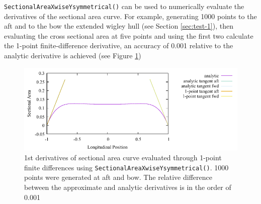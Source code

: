 \documentclass{report}
\begin{document}
\newpar \texttt{SectionalAreaXwiseYsymmetrical()} can be used to numerically evaluate the derivatives of the sectional area curve.
For example, generating 1000 points to the aft and to the bow the extended wigley hull (see Section \ref{sec:test-1}), then evaluating 
the cross sectional area at five points and using the first two calculate the 1-point finite-difference derivative, an accuracy of 
0.001 relative to the analytic derivative is achieved (see Figure \ref{fig:test-2-1K-l-100-derivatives})
\begin{figure}[H]
    \centering
    \includegraphics[width=0.7\linewidth]{figures/test-2-1K-l-100-derivatives.pdf}
    \caption{1st derivatives of sectional area curve evaluated through 1-point finite differences using \texttt{SectionalAreaXwiseYsymmetrical()}. 
    1000 points were generated at aft and bow. The relative difference between the approximate
    and analytic derivatives is in the order of 0.001}
    \label{fig:test-2-1K-l-100-derivatives}
\end{figure}
\end{document}
